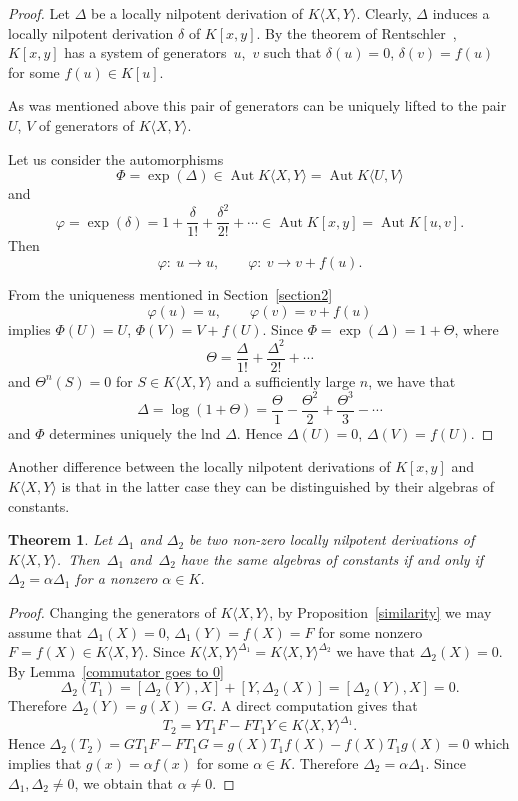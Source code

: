 \documentclass[pdftex]{sigma}
\numberwithin{equation}{section}
\newtheorem{Theorem}{Theorem}[section]
\begin{document}
\begin{proof} Let $\Delta$ be a locally nilpotent derivation of $K\langle X,Y\rangle$. Clearly, $\Delta$ induces a locally nilpotent derivation $\delta$ of $K[x,y]$.
By the theorem of Rentschler~\cite{R}, $K[x,y]$ has a system of generators~$u$,~$v$ such that $\delta(u)=0$, $\delta(v)=f(u)$ for some $f(u)\in K[u]$.

As was mentioned above this pair of generators can be uniquely lifted to the pair $U$, $V$ of generators of $K\langle X,Y\rangle$.

Let us consider the automorphisms
\[
\varPhi=\exp(\Delta)\in \operatorname{Aut}K\langle X,Y\rangle=\operatorname{Aut}K\langle U,V\rangle
\]
and
\[
\varphi=\exp(\delta) =1+\frac{\delta}{1!}+\frac{\delta^2}{2!}+\cdots\in\operatorname{Aut}K[x,y]=\operatorname{Aut}K[u,v].
\]
Then
\[
\varphi\colon \ u\to u,\qquad \varphi\colon \ v\to v+f(u).
\]

From the uniqueness mentioned in Section~\ref{section2}
\[
\varphi(u) = u,\qquad \varphi(v) = v+f(u)
\]
implies $\varPhi(U) = U$, $\varPhi(V) = V+f(U)$. Since $\varPhi=\exp(\Delta)=1+\varTheta$, where
\[
\varTheta=\frac{\Delta}{1!}+\frac{\Delta^2}{2!}+\cdots
\]
and $\varTheta^n(S)=0$ for $S\in K\langle X,Y\rangle$ and a sufficiently large $n$, we have that
\[
\Delta=\log(1+\varTheta)=\frac{\varTheta}{1}-\frac{\varTheta^2}{2}+\frac{\varTheta^3}{3}-\cdots
\]
and $\varPhi$ determines uniquely the lnd $\Delta$. Hence $\Delta(U) = 0$, $\Delta(V) = f(U)$.
\end{proof}

Another difference between the locally nilpotent derivations of $K[x,y]$ and $K\langle X,Y\rangle$ is that in the latter case they can be distinguished by their algebras of constants.

\begin{Theorem}\label{derivations with the same kernel}
Let $\Delta_1$ and $\Delta_2$ be two non-zero locally nilpotent derivations of $K\langle {X,Y}\rangle$.\
Then~$\Delta_1$ and~$\Delta_2$ have the same algebras of constants if and only if $\Delta_2=\alpha\Delta_1$ for a nonzero $\alpha\in K$.
\end{Theorem}

\begin{proof} Changing the generators of $K\langle X,Y\rangle$, by Proposition~\ref{similarity} we may assume that \mbox{$\Delta_1(X){=}0$}, $\Delta_1(Y)=f(X)=F$ for some nonzero $F=f(X)\in K\langle X,Y\rangle$. Since $K\langle X,Y\rangle^{\Delta_1}=K\langle X,Y\rangle^{\Delta_2}$ we have that $\Delta_2(X) = 0$. By Lemma~\ref{commutator goes to 0}
\[
\Delta_2(T_1) = [\Delta_2(Y),X]+[Y,\Delta_2(X)] = [\Delta_2(Y),X] = 0.
\]
Therefore $\Delta_2(Y)=g(X)= G$. A direct computation gives that
\[
T_2 = YT_1F - FT_1Y \in K\langle X,Y\rangle^{\Delta_1}.
\]
Hence $\Delta_2(T_2)=GT_1F - FT_1G = g(X)T_1f(X)-f(X)T_1g(X) = 0$ which implies that $g(x)=\alpha f(x)$ for some $\alpha\in K$. Therefore $\Delta_2=\alpha \Delta_1$. Since $\Delta_1,\Delta_2\not=0$, we obtain that $\alpha\not=0$.
\end{proof}
\end{document}
